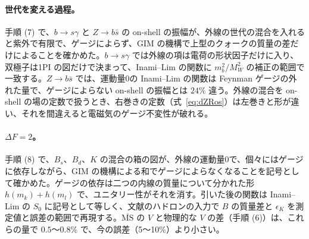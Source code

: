 \documentclass[a4paper,10pt]{ltjsarticle}
\newcommand{\MSbar}{\overline{\mathrm{MS}}}
\begin{document}
\paragraph{世代を変える過程。}手順 (7) で、$b\to s\gamma$ と $Z\to b\bar s$ の on-shell の振幅が、外線の世代の混合を入れると紫外で有限で、ゲージによらず、GIM の機構で上型のクォークの質量の差だけによることを確かめた。$b\to s\gamma$ では外線の項は電荷の形状因子だけに入り、双極子は1PI の図だけで決まって、Inami--Lim の関数に $m_b^2/M_W^2$ の補正の範囲で一致する。$Z\to b\bar s$ では、運動量0の Inami--Lim の関数は Feynman ゲージの外れた量で、ゲージによらない on-shell の振幅とは $24\%$ 違う。外線の混合を on-shell の場の定数で扱うとき、右巻きの定数（式~\eqref{eq:dZRos}）は左巻きと形が違い、それを間違えると電磁気のゲージ不変性が破れる。

\paragraph{$\Delta F=2$。}手順 (8) で、$B_s$、$B_d$、$K$ の混合の箱の図が、外線の運動量0で、個々にはゲージに依存しながら、GIM の機構による和でゲージによらなくなることを記号として確かめた。ゲージの依存は二つの内線の質量について分かれた形 $h(m_k)+h(m_l)$ で、ユニタリー性がそれを消す。引いた後の関数は Inami--Lim の $S_0$ に記号として等しく、文献のハドロンの入力で $B$ の質量差と $\epsilon_K$ を測定値と誤差の範囲で再現する。$\MSbar$ の $V$ と物理的な $V$ の差（手順 (6)）は、これらの量で $0.5$〜$0.8\%$ で、今の誤差（5〜10\%）より小さい。
\end{document}
